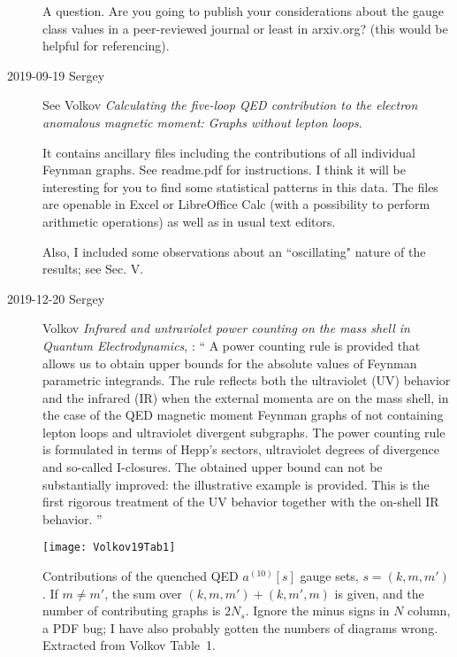 \begin{description}
A question. Are you going to publish your considerations about the gauge
class values in a peer-reviewed journal or least in arxiv.org? (this
would be helpful for referencing).

\item[2019-09-19 Sergey] See Volkov {\em Calculating the
five-loop {QED} contribution to the electron anomalous magnetic moment:
{Graphs} without lepton loops}.

It contains ancillary files including the contributions of all individual
Feynman graphs. See readme.pdf for instructions. I think it will be
interesting for you to find some statistical patterns in this data. The
files are openable in Excel or LibreOffice Calc (with a possibility to
perform arithmetic operations) as well as in usual text editors.

Also, I included some observations about an ``oscillating" nature of the
results; see Sec. V.

\item[2019-12-20 Sergey] Volkov {\em Infrared and
untraviolet power counting on the mass shell in {Quantum
Electrodynamics}}, : ``
A power counting rule is provided that allows us to obtain upper bounds
for the absolute values of Feynman parametric integrands. The rule
reflects both the ultraviolet (UV) behavior and the infrared (IR) when
the external momenta are on the mass shell, in the case of the QED
magnetic moment Feynman graphs of not containing lepton loops and
ultraviolet divergent subgraphs. The power counting rule is formulated in
terms of Hepp's sectors, ultraviolet degrees of divergence and so-called
I-closures. The obtained upper bound can not be substantially improved:
the illustrative example is provided. This is the first rigorous
treatment of the UV behavior together with the on-shell IR behavior.
''

\begin{table}
\begin{center}
\texttt{[image: Volkov19Tab1]}
\end{center}
\caption{\label{Volkov19Tab1}
Contributions of the quenched QED $a^{(10)}[s]$ gauge sets, $s=(k,m,m')$.
If $m\neq m'$, the sum over $(k,m,m')+(k,m',m)$ is given, and the number
of contributing graphs is $2N_s$. Ignore the minus signs in $N$ column, a
PDF bug; I have also probably gotten the numbers of diagrams wrong.
Extracted from Volkov Table~1.
}
\end{table}


\end{description}
